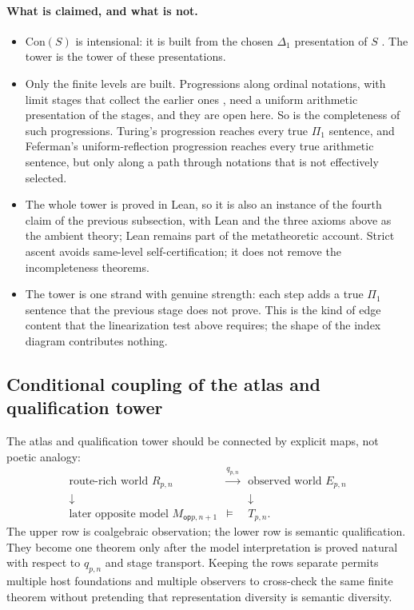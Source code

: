 \documentclass[11pt]{article}
\theoremstyle{definition}
\theoremstyle{remark}
\newcommand{\op}{\mathsf{op}}
\begin{document}
\paragraph{What is claimed, and what is not.}
\begin{itemize}[leftmargin=*]
\item $\mathrm{Con}(S)$ is intensional: it is built from the chosen $\Delta_1$
  presentation of $S$ \cite{FefermanArithmetization}.  The tower is the tower of
  these presentations.
\item Only the finite levels are built.  Progressions along ordinal notations,
  with limit stages that collect the earlier ones
  \cite{TuringOrdinalLogics,FefermanProgressions}, need a uniform arithmetic
  presentation of the stages, and they are open here.  So is the completeness
  of such progressions.  Turing's progression reaches every true $\Pi_1$
  sentence, and Feferman's uniform-reflection progression reaches every true
  arithmetic sentence, but only along a path through notations that is not
  effectively selected.
\item The whole tower is proved in Lean, so it is also an instance of the
  fourth claim of the previous subsection, with Lean and the three axioms above
  as the ambient theory; Lean remains part of the metatheoretic account.  Strict
  ascent avoids same-level self-certification; it does not remove the
  incompleteness theorems.
\item The tower is one strand with genuine strength: each step adds a true
  $\Pi_1$ sentence that the previous stage does not prove.  This is the kind of
  edge content that the linearization test above requires; the shape of the
  index diagram contributes nothing.
\end{itemize}

\subsection{Conditional coupling of the atlas and qualification tower}

The atlas and qualification tower should be connected by explicit maps, not
poetic analogy:
\[
\begin{array}{ccc}
\text{route-rich world }R_{p,n} & \xrightarrow{q_{p,n}} &
  \text{observed world }E_{p,n}\\
\downarrow & & \downarrow\\
\text{later opposite model }M_{\op p,n+1} & \models & T_{p,n}.
\end{array}
\]
The upper row is coalgebraic observation; the lower row is semantic
qualification.  They become one theorem only after the model interpretation is
proved natural with respect to $q_{p,n}$ and stage transport.  Keeping the rows
separate permits multiple host foundations and multiple observers to cross-check
the same finite theorem without pretending that representation diversity is
semantic diversity.
\end{document}
